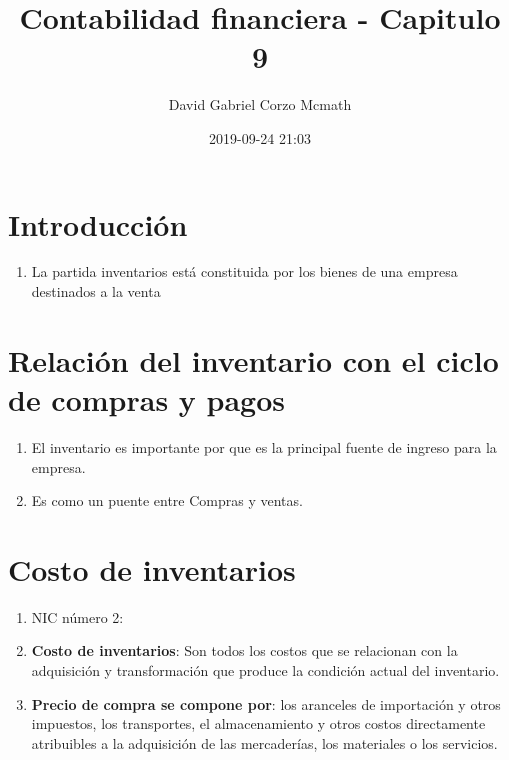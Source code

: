 \documentclass{article}
\author{David Gabriel Corzo Mcmath}
\title{Contabilidad financiera - Capitulo 9 }
\date{2019-09-24 21:03}
\begin{document}
\maketitle


\section{Introducción}
\begin{enumerate}
    \item La partida inventarios está constituida por los bienes de una empresa destinados a la venta 
\end{enumerate}

\section{Relación del inventario con el ciclo de compras y pagos}
\begin{enumerate}
    \item El inventario es importante por que es la principal fuente de ingreso para la empresa.
    \item Es como un puente entre Compras y ventas.
\end{enumerate}

\section{Costo de inventarios}
\begin{enumerate}
    \item NIC número 2:
    \item \textbf{Costo de inventarios}: Son todos los costos que se relacionan con la adquisición y transformación que produce la condición actual del inventario.
    \item \textbf{Precio de compra se compone por}:  los aranceles de importación y otros impuestos, los transportes, el almacenamiento y otros costos directamente atribuibles a la adquisición de las mercaderías, los materiales o los servicios.
\end{enumerate}
\end{document}
